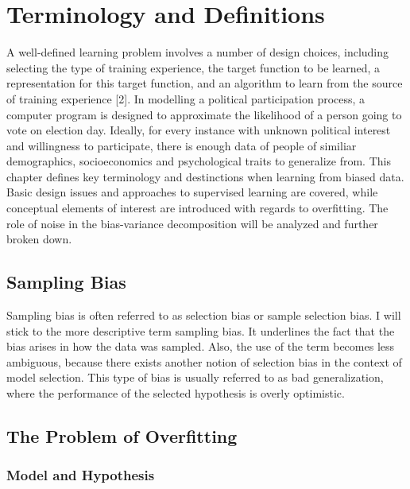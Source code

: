\chapter{Terminology and Definitions}

A well-defined learning problem involves a number of design choices, including selecting the type of training experience, the target function to be learned, a representation for this target function, and an algorithm to learn from the source of training experience [2]. In modelling a political participation process, a computer program is designed to approximate the likelihood of a person going to vote on election day. Ideally, for every instance with unknown political interest and willingness to participate, there is enough data of people of similiar demographics, socioeconomics and psychological traits to generalize from. This chapter defines key terminology and destinctions when learning from biased data. Basic design issues and approaches to supervised learning are covered, while conceptual elements of interest are introduced with regards to overfitting. The role of noise in the bias-variance decomposition will be analyzed and further broken down.

\section{Sampling Bias}


Sampling bias is often referred to as selection bias or sample selection bias. I will stick to the more descriptive term sampling bias. It underlines the fact that the bias arises in how the data was sampled. Also, the use of the term becomes less ambiguous, because there exists another notion of selection bias in the context of model selection. This type of bias is usually referred to as bad generalization, where the performance of the selected hypothesis is overly optimistic.

\section{The Problem of Overfitting}

\subsection{Model and Hypothesis}

